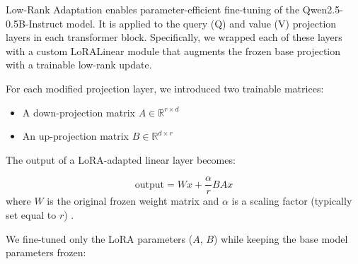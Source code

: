 \documentclass[a4paper,12pt]{article}
\begin{document}
Low-Rank Adaptation enables parameter-efficient fine-tuning of the Qwen2.5-0.5B-Instruct model. It is applied to the query (Q) and value (V) projection layers in each transformer block. Specifically, we wrapped each of these layers with a custom LoRALinear module that augments the frozen base projection with a trainable low-rank update.

For each modified projection layer, we introduced two trainable matrices:
\begin{itemize}
    \item A down-projection matrix $A \in \mathbb{R}^{r \times d}$
    \item An up-projection matrix $B \in \mathbb{R}^{d \times r}$
\end{itemize}

The output of a LoRA-adapted linear layer becomes:

\begin{equation}
\text{output} = W x + \frac{\alpha}{r} B A x
\end{equation}
where $W$ is the original frozen weight matrix and $\alpha$ is a scaling factor (typically set equal to $r$) \citep{hu2021lora}.

We fine-tuned only the LoRA parameters ($A$, $B$) while keeping the base model parameters frozen:
\end{document}
